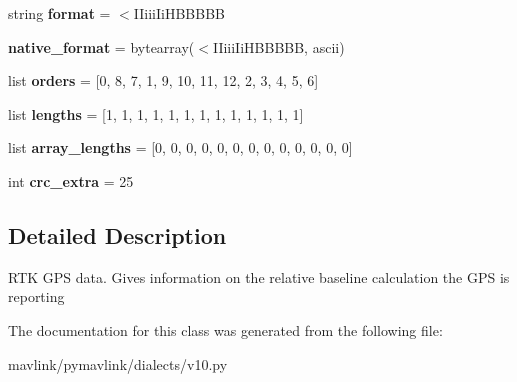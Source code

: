 \begin{DoxyCompactItemize}
\item 
\mbox{\label{classpymavlink_1_1dialects_1_1v10_1_1MAVLink__gps__rtk__message_ae0024eb80b35f301fa3476177dc6a1e7}} 
string {\bfseries format} = \textquotesingle{}$<$I\+Iiii\+Ii\+H\+B\+B\+B\+BB\textquotesingle{}
\item 
\mbox{\label{classpymavlink_1_1dialects_1_1v10_1_1MAVLink__gps__rtk__message_a6ba784acd418a1322bb1e58aecc1b237}} 
{\bfseries native\+\_\+format} = bytearray(\textquotesingle{}$<$I\+Iiii\+Ii\+H\+B\+B\+B\+BB\textquotesingle{}, \textquotesingle{}ascii\textquotesingle{})
\item 
\mbox{\label{classpymavlink_1_1dialects_1_1v10_1_1MAVLink__gps__rtk__message_ad70cb81640e0199bd9dbb0655d9eba3e}} 
list {\bfseries orders} = \mbox{[}0, 8, 7, 1, 9, 10, 11, 12, 2, 3, 4, 5, 6\mbox{]}
\item 
\mbox{\label{classpymavlink_1_1dialects_1_1v10_1_1MAVLink__gps__rtk__message_aa9ee2c61962233d6d5c3e1bc15063251}} 
list {\bfseries lengths} = \mbox{[}1, 1, 1, 1, 1, 1, 1, 1, 1, 1, 1, 1, 1\mbox{]}
\item 
\mbox{\label{classpymavlink_1_1dialects_1_1v10_1_1MAVLink__gps__rtk__message_a2e33c7a754cc5e54329e4dd45282bc13}} 
list {\bfseries array\+\_\+lengths} = \mbox{[}0, 0, 0, 0, 0, 0, 0, 0, 0, 0, 0, 0, 0\mbox{]}
\item 
\mbox{\label{classpymavlink_1_1dialects_1_1v10_1_1MAVLink__gps__rtk__message_a7515a1bcc2d5b768d1175e3ec4dd934b}} 
int {\bfseries crc\+\_\+extra} = 25
\end{DoxyCompactItemize}


\subsection{Detailed Description}
\begin{DoxyVerb}RTK GPS data. Gives information on the relative baseline
calculation the GPS is reporting
\end{DoxyVerb}
 

The documentation for this class was generated from the following file\+:\begin{DoxyCompactItemize}
\item 
mavlink/pymavlink/dialects/v10.\+py\end{DoxyCompactItemize}
